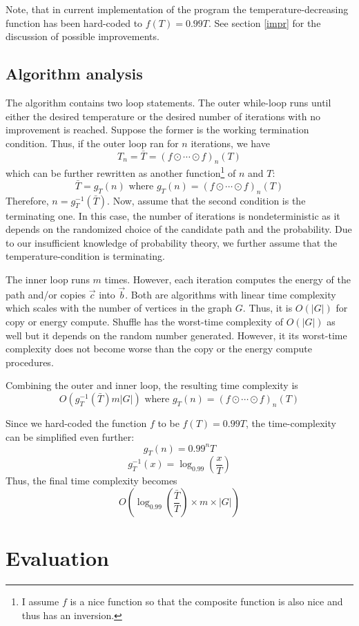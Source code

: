 \documentclass{article}
\begin{document}
Note, that in current implementation of the program the temperature-decreasing function has been hard-coded to $f(T) = 0.99T$. See section \ref{impr} for the discussion of possible improvements.

\subsection{Algorithm analysis}

The algorithm contains two loop statements. The outer while-loop runs until either the desired temperature or the desired number of iterations with no improvement is reached. Suppose the former is the working termination condition. Thus, if the outer loop ran for $n$ iterations, we have 
$$T_n = \bar{T} = (f \odot \cdots \odot f)_n(T)$$ 
which can be further rewritten as another function\footnote{I assume $f$ is a nice function so that the composite function is also nice and thus has an inversion.} of $n$ and $T$:
$$ \bar{T} = g_T(n) \text{ where } g_T(n) = (f \odot \cdots \odot f)_n(T)$$
Therefore, $n = g_T^{-1}(\bar{T})$. Now, assume that the second condition is the terminating one. In this case, the number of iterations is nondeterministic as it depends on the randomized choice of the candidate path and the probability. Due to our insufficient knowledge of probability theory, we further assume that the temperature-condition is terminating.

The inner loop runs $m$ times. However, each iteration computes the energy of the path and/or copies $\vec{c}$ into $\vec{b}$. Both are algorithms with linear time complexity which scales with the number of vertices in the graph $G$. Thus, it is $O(|G|)$ for copy or energy compute. Shuffle has the worst-time complexity of $O(|G|)$ as well but it depends on the random number generated. However, it its worst-time complexity does not become worse than the copy or the energy compute procedures.

Combining the outer and inner loop, the resulting time complexity is 
$$O(g_T^{-1}(\bar{T})m|G|) \text{ where } g_T(n) = (f \odot \cdots \odot f)_n(T)$$

Since we hard-coded the function $f$ to be $f(T) = 0.99T$, the time-complexity can be simplified even further:
$$ g_T(n) = 0.99^n T $$
$$ g_T^{-1}(x) =  \log_{0.99}(\frac{x}{T}) $$
Thus, the final time complexity becomes
$$ O(\log_{0.99}(\frac{\bar{T}}{T}) \times m \times |G|) $$

\section{Evaluation}
\end{document}
